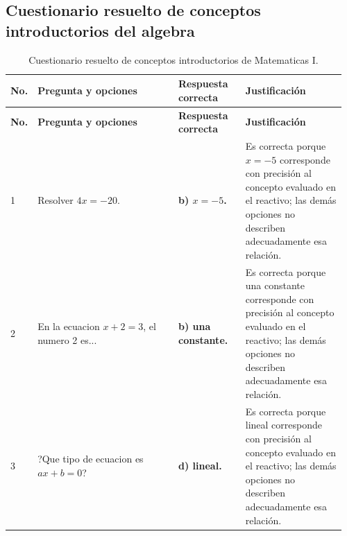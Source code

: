 \documentclass[
	spanish,
	letterpaper, oneside
]{article}
\begin{document}

\subsection{Cuestionario resuelto de conceptos introductorios del algebra}

\clearpage
\pagestyle{empty}
\begin{landscape}
\begingroup
\scriptsize
\setlength{\tabcolsep}{4pt}\renewcommand{\arraystretch}{1.25}
\begin{longtable}{@{}>{\centering\arraybackslash}p{0.035\linewidth}>{\raggedright\arraybackslash}p{0.42\linewidth}>{\raggedright\arraybackslash}p{0.20\linewidth}>{\raggedright\arraybackslash}p{0.30\linewidth}@{}}
\caption{Cuestionario resuelto de conceptos introductorios de Matematicas I.}\label{tab:reporte-matematicas-i-actividad-1}\\
\toprule
\textbf{No.} & \textbf{Pregunta y opciones} & \textbf{Respuesta correcta} & \textbf{Justificación} \\
\midrule
\endfirsthead
\toprule
\textbf{No.} & \textbf{Pregunta y opciones} & \textbf{Respuesta correcta} & \textbf{Justificación} \\
\midrule
\endhead
\bottomrule
\endfoot
\bottomrule
\endlastfoot
1 & Resolver $4x=-20$. & \textbf{b) $x=-5$.} & Es correcta porque $x=-5$ corresponde con precisión al concepto evaluado en el reactivo; las demás opciones no describen adecuadamente esa relación. \\
\midrule
2 & En la ecuacion $x+2=3$, el numero 2 es... & \textbf{b) una constante.} & Es correcta porque una constante corresponde con precisión al concepto evaluado en el reactivo; las demás opciones no describen adecuadamente esa relación. \\
\midrule
3 & ?Que tipo de ecuacion es $ax+b=0$? & \textbf{d) lineal.} & Es correcta porque lineal corresponde con precisión al concepto evaluado en el reactivo; las demás opciones no describen adecuadamente esa relación. \\

\end{longtable}
\end{landscape}
\end{document}

